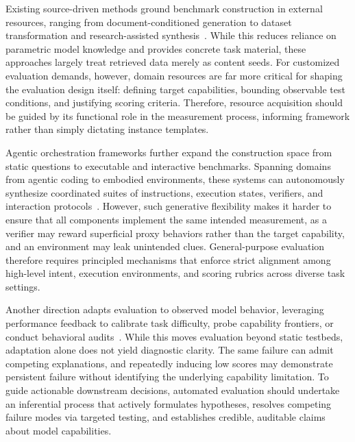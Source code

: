 \documentclass{article} %
\begin{document}
Existing source-driven methods ground benchmark construction in external resources, ranging from document-conditioned generation to dataset transformation and research-assisted synthesis~\citep{shashidhar2025yourbench,xiong2026benchmarkagent,dong2026agentworld}. While this reduces reliance on parametric model knowledge and provides concrete task material, these approaches largely treat retrieved data merely as content seeds. For customized evaluation demands, however, domain resources are far more critical for shaping the evaluation design itself: defining target capabilities, bounding observable test conditions, and justifying scoring criteria. Therefore, resource acquisition should be guided by its functional role in the measurement process, informing framework rather than simply dictating instance templates.

Agentic orchestration frameworks further expand the construction space from static questions to executable and interactive benchmarks. Spanning domains from agentic coding to embodied environments, these systems can autonomously synthesize coordinated suites of instructions, execution states, verifiers, and interaction protocols~\citep{benchagents2025,embodiedbenchclaw2026,aggarwal2026gymanything,anchor2026,benchforge2026}. However, such generative flexibility makes it harder to ensure that all components implement the same intended measurement, as a verifier may reward superficial proxy behaviors rather than the target capability, and an environment may leak unintended clues. General-purpose evaluation therefore requires principled mechanisms that enforce strict alignment among high-level intent, execution environments, and scoring rubrics across diverse task settings.

Another direction adapts evaluation to observed model behavior, leveraging performance feedback to calibrate task difficulty, probe capability frontiers, or conduct behavioral audits~\citep{li2025autobencher,betal2025,benchevolver2026,dong2026agentworld,fronsdal2025petri,bloom2025}. While this moves evaluation beyond static testbeds, adaptation alone does not yield diagnostic clarity. The same failure can admit competing explanations, and repeatedly inducing low scores may demonstrate persistent failure without identifying the underlying capability limitation. To guide actionable downstream decisions, automated evaluation should undertake an inferential process that actively formulates hypotheses, resolves competing failure modes via targeted testing, and establishes credible, auditable claims about model capabilities.
	
\end{document}
